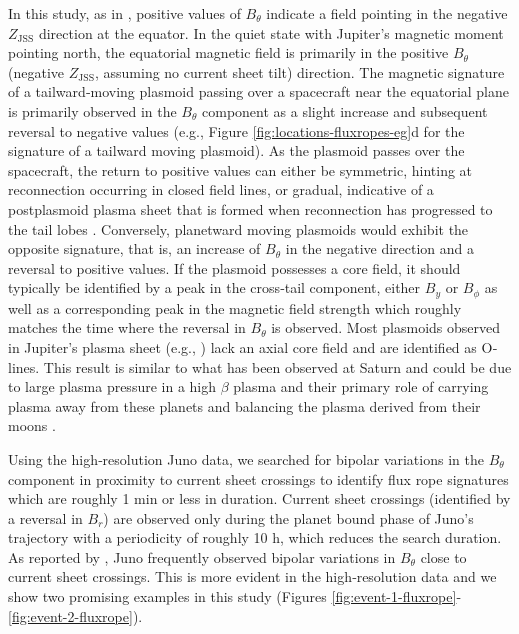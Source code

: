 In this study, as in , positive values of $B_\theta$ indicate a field pointing in the negative $Z_\text{JSS}$ direction at the equator. In the quiet state with Jupiter's magnetic moment pointing north, the equatorial magnetic field is primarily in the positive $B_\theta$ (negative $Z_\text{JSS}$, assuming no current sheet tilt) direction. The magnetic signature of a tailward‐moving plasmoid passing over a spacecraft near the equatorial plane is primarily observed in the $B_\theta$ component as a slight increase and subsequent reversal to negative values (e.g., Figure \ref{fig:locations-fluxropes-eg}d for the signature of a tailward moving plasmoid). As the plasmoid passes over the spacecraft, the return to positive values can either be symmetric, hinting at reconnection occurring in closed field lines, or gradual, indicative of a postplasmoid plasma sheet that is formed when reconnection has progressed to the tail lobes \cite{Jackman2011CassiniSaturn,Jia2012}. Conversely, planetward moving plasmoids would exhibit the opposite signature, that is, an increase of $B_\theta$ in the negative direction and a reversal to positive values. If the plasmoid possesses a core field, it should typically be identified by a peak in the cross‐tail component, either $B_y$ or $B_\phi$ as well as a corresponding peak in the magnetic field strength which roughly matches the time where the reversal in $B_\theta$ is observed. Most plasmoids observed in Jupiter's plasma sheet (e.g., ) lack an axial core field and are identified as O‐lines. This result is similar to what has been observed at Saturn \cite{Jackman2011CassiniSaturn} and could be due to large plasma pressure in a high $\beta$ plasma and their primary role of carrying plasma away from these planets and balancing the plasma derived from their moons \cite{Cowley2015Down-tailMagnetospheres,Kivelson1995ModelsPlasmas}.

Using the high‐resolution Juno data, we searched for bipolar variations in the $B_\theta$ component in proximity to current sheet crossings to identify flux rope signatures which are roughly 1 min or less in duration. Current sheet crossings (identified by a reversal in $B_r$) are observed only during the planet bound phase of Juno's trajectory with a periodicity of roughly 10 h, which reduces the search duration. As reported by \cite{Vogt2020MagnetotailObservations}, Juno frequently observed bipolar variations in $B_\theta$ close to current sheet crossings. This is more evident in the high‐resolution data and we show two promising examples in this study (Figures \ref{fig:event-1-fluxrope}-\ref{fig:event-2-fluxrope}). 

